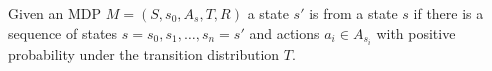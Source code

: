 \begin{comment}
	Finally, observe that by acyclicity and construction
	\begin{align*}
		& P(U_i=1, E_{s_0a_0}=s_1,\dots,E_{s_n a_n}=s_{n+1}) \\
		&= \mu_i(s_0) \prod_{i=0}^n \frac{T(s_i,a_i,s_{i+1})\,\mu_i(s_{i+1})}{\mu_i(s_i)} \\
		&= \mu_i(s_{n+1}) \prod_{i=0}^n T(s_i,a_i,s_{i+1}),
	\intertext{and similarly}
		& P(U_i=0, E_{s_0a_0}=s_1,\dots,E_{s_n a_n}=s_{n+1}) \\
		&= (1-\mu_i(s_{n+1})) \prod_{i=0}^n T(s_i,a_i,s_{i+1}).
	\end{align*}
	As a result
	\begin{align*}
		& \IE(U_i\given E_{s_0a_0}=s_1,\dots,E_{s_n a_n}=s_{n+1})\\
		& = \mu_i(s_n) = \mu_i(t(h))\\
		& P(E_{s_n a_n}=s_{n+1} \given E_{s_0a_0}=s_1,\dots,E_{s_{n-1} a_{n-1}}=s_{n}) \\
		&=  T(s_n,a,s_{n+1}) = T(t(h),a,t(h'))
	\end{align*}

	Thus the metalevel decision problem $M'$ is equivalent to the original MDP $M$
	under the mapping $t\maps H\to S$.

	For the converse, observe that the properties hold with $c$ the cost of computation
	and \[\mu_i(s) = \IE(U_i\given E_1=e_1,\dots,E_n=e_n)\] where $s=\langle e_1,\dots,e_n \rangle$.
	\end{proof}
\end{comment}




















\begin{dfn}
	Given an MDP $M=(S,s_0,A_s,T,R)$ a state $s'$ is  from a state $s$
	if there is a sequence of states $s=s_0,s_1,\dots,s_n=s'$ and actions $a_i\in A_{s_i}$
	with positive probability under the transition distribution $T$.
\end{dfn}


